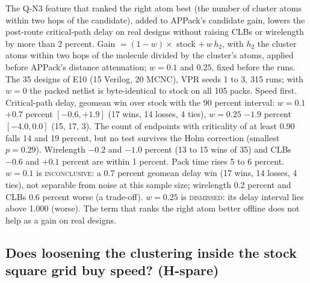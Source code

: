  The Q-N3 feature that ranked the right atom best (the number of cluster atoms within two hops of the candidate), added to APPack's candidate gain, lowers the post-route critical-path delay on real designs without raising CLBs or wirelength by more than 2 percent. %
 Gain $=(1-w)\times$ stock $+\,w\,h_2$, with $h_2$ the cluster atoms within two hops of the molecule divided by the cluster's atoms, applied before APPack's distance attenuation; $w=0.1$ and $0.25$, fixed before the runs. The 35 designs of E10 (15 Verilog, 20 MCNC), VPR seeds 1 to 3, 315 runs; with $w=0$ the packed netlist is byte-identical to stock on all 105 packs.
 Speed first. Critical-path delay, geomean win over stock with the 90 percent interval: $w=0.1$ $+0.7$ percent $[-0.6,+1.9]$ (17 wins, 14 losses, 4 ties), $w=0.25$ $-1.9$ percent $[-4.0,0.0]$ (15, 17, 3). The count of endpoints with criticality of at least 0.90 falls 14 and 19 percent, but no test survives the Holm correction (smallest $p=0.29$). Wirelength $-0.2$ and $-1.0$ percent (13 to 15 wins of 35) and CLBs $-0.6$ and $+0.1$ percent are within 1 percent. Pack time rises 5 to 6 percent.
 $w=0.1$ is \textsc{inconclusive}: a 0.7 percent geomean delay win (17 wins, 14 losses, 4 ties), not separable from noise at this sample size; wirelength 0.2 percent and CLBs 0.6 percent worse (a trade-off). $w=0.25$ is \textsc{dismissed}: its delay interval lies above 1.000 (worse). The term that ranks the right atom better offline does not help as a gain on real designs.
\subsection{Does loosening the clustering inside the stock square grid buy speed? (H-spare)}
\label{sec:e-spare}

